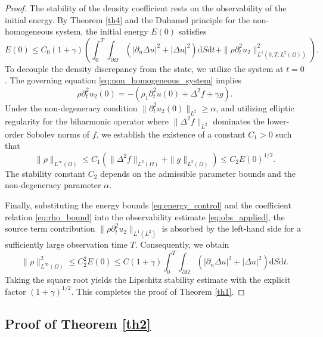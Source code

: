 \documentclass[12pt,reqno]{amsart}
\numberwithin{equation}{section}
\begin{document}
\begin{proof}
		The stability of the density coefficient rests on the observability of the initial energy. By Theorem \ref{th4} and the Duhamel principle for the non-homogeneous system, the initial energy $E(0)$ satisfies
		\begin{equation}\label{eq:obs_applied}
			E(0) \le C_0 (1+\gamma) \left( \int_{0}^{T} \int_{\partial\Omega} \left( |\partial_n \Delta u|^2 + |\Delta u|^2 \right) \mathrm{d}S \mathrm{d}t + \|\rho \partial_t^2 u_2\|_{L^1(0,T; L^2(\Omega))}^2 \right).
		\end{equation}
		To decouple the density discrepancy from the state, we utilize the system at $t=0$. The governing equation \eqref{eq:non_homogeneous_system} implies
		\begin{equation*}
			\rho \partial_t^2 u_2(0) = -(\rho_1 \partial_t^2 u(0) + \Delta^2 f + \gamma g).
		\end{equation*}
		Under the non-degeneracy condition $\|\partial_t^2 u_2(0)\|_{L^2} \ge \alpha$, and utilizing elliptic regularity for the biharmonic operator where $\|\Delta^2 f\|_{L^2}$ dominates the lower-order Sobolev norms of $f$, we establish the existence of a constant $C_1 > 0$ such that
		\begin{equation}\label{eq:rho_bound}
			\|\rho\|_{L^\infty(\Omega)} \le C_1 \left( \|\Delta^2 f\|_{L^2(\Omega)} + \|g\|_{L^2(\Omega)} \right) \le C_2 E(0)^{1/2}.
		\end{equation}
		The stability constant $C_2$ depends on the admissible parameter bounds and the non-degeneracy parameter $\alpha$. 
		
		Finally, substituting the energy bounds \eqref{eq:energy_control} and the coefficient relation \eqref{eq:rho_bound} into the observability estimate \eqref{eq:obs_applied}, the source term contribution $\|\rho \partial_t^2 u_2\|_{L^1(L^2)}$ is absorbed by the left-hand side for a sufficiently large observation time $T$. Consequently, we obtain
		\begin{equation*}
			\|\rho\|_{L^\infty(\Omega)}^2 \le C_2^2 E(0) \le C (1+\gamma) \int_{0}^{T} \int_{\partial\Omega} \left( |\partial_n \Delta u|^2 + |\Delta u|^2 \right) \mathrm{d}S \mathrm{d}t.
		\end{equation*}
		Taking the square root yields the Lipschitz stability estimate with the explicit factor $(1+\gamma)^{1/2}$. This completes the proof of Theorem \ref{th1}.
	\end{proof}
	
	
	\subsection{Proof of Theorem \ref{th2}}
	
\end{document}
